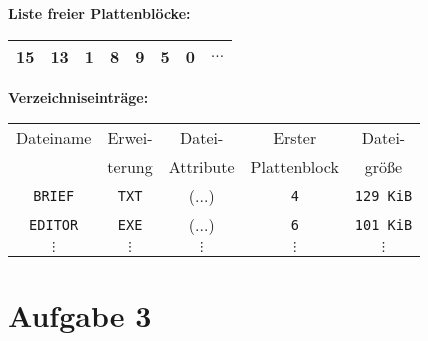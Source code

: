 \documentclass{scrartcl}
\begin{document}
\begin{minipage}[t]{0.6\columnwidth}%
  \vspace{1cm}
  \textbf{Liste freier Plattenbl\"{o}cke:}

  \begin{tabular}{|c|c|c|c|c|c|c|c}
    \hline
    15 & 13 & 1 & 8 & 9 & 5 & 0 & $\dots$\\
    \hline
  \end{tabular}

  \vspace{2cm}

  \textbf{Verzeichniseintr\"{a}ge:}

  \begin{tabular}{|c|c|c|c|c|}
    \hline
    Dateiname       & Erwei-       & Datei-    & Erster       & Datei-           \\
                    & terung       & Attribute & Plattenblock & gr\"{o}\ss{}e    \\\hline
    \texttt{BRIEF}  & \texttt{TXT} & ($\dots$) & \texttt{4}   & \texttt{129 KiB} \\
    \texttt{EDITOR} & \texttt{EXE} & ($\dots$) & \texttt{6}   & \texttt{101 KiB} \\
    $\vdots$        & $\vdots$     & $\vdots$  & $\vdots$     & $\vdots$         \\
  \end{tabular}%
\end{minipage}



\section*{Aufgabe 3}
\end{document}
